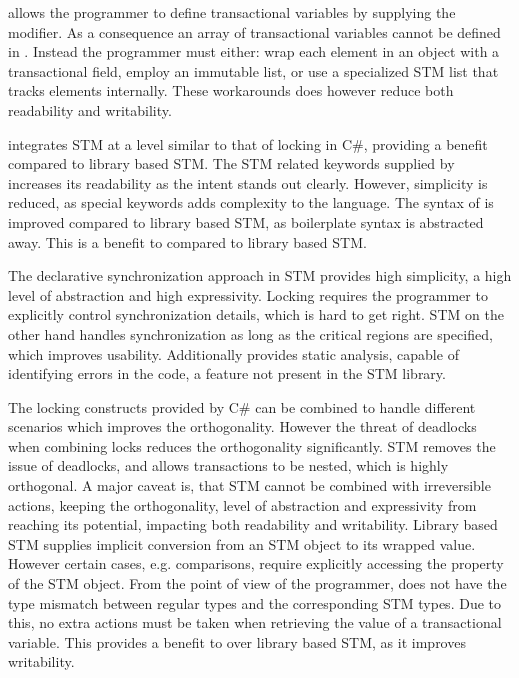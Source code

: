 \stmname allows the programmer to define transactional variables by supplying the  modifier. As a consequence an array of transactional variables cannot be defined in \stmname. Instead the programmer must either: wrap each element in an object with a transactional field, employ an immutable list, or use a specialized \ac{STM} list that tracks elements internally. These workarounds does however reduce both readability and writability. 

\stmname integrates \ac{STM} at a level similar to that of locking in C\#, providing a benefit compared to library based \ac{STM}. The \ac{STM} related keywords supplied by \stmname increases its readability as the intent stands out clearly. However, simplicity is  reduced, as special keywords adds complexity to the language. The syntax of \stmname is improved compared to library based \ac{STM}, as boilerplate syntax is abstracted away. This is a benefit to \stmname compared to library based \ac{STM}. 

The declarative synchronization approach in \ac{STM} provides high simplicity, a high level of abstraction and high expressivity. Locking requires the programmer to explicitly control synchronization details, which is hard to get right. \ac{STM} on the other hand handles synchronization as long as the critical regions are specified, which improves usability. Additionally \stmname provides static analysis, capable of identifying errors in the code, a feature not present in the \ac{STM} library. 

The locking constructs provided by C\#  can be  combined to handle different scenarios which improves the orthogonality. However the threat of deadlocks when combining locks reduces the orthogonality significantly. \ac{STM} removes the issue of deadlocks, and allows transactions to be nested, which is highly orthogonal. A major caveat is, that \ac{STM} cannot be combined with irreversible actions, keeping the orthogonality, level of abstraction and expressivity from reaching its potential, impacting both readability and writability. Library based \ac{STM} supplies implicit conversion from an \ac{STM} object to its wrapped value. However certain cases,  e.g. comparisons, require explicitly accessing the  property of the \ac{STM} object. From the point of view of the programmer, \stmname does not have the type mismatch between regular types and the corresponding \ac{STM} types. Due to this, no extra actions must be taken when retrieving the value of a transactional variable. This provides a benefit to \stmname over library based \ac{STM}, as it improves writability.

